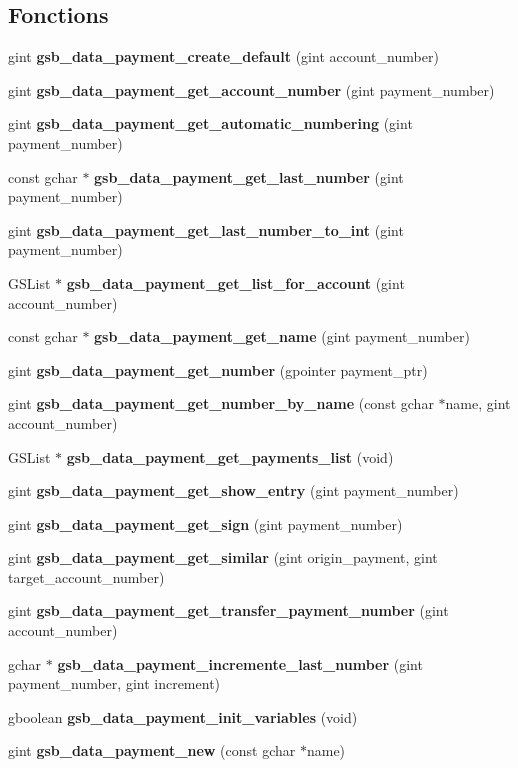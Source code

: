 \subsection*{Fonctions}
\begin{DoxyCompactItemize}
\item 
gint {\bf gsb\_\-data\_\-payment\_\-create\_\-default} (gint account\_\-number)
\item 
gint {\bf gsb\_\-data\_\-payment\_\-get\_\-account\_\-number} (gint payment\_\-number)
\item 
gint {\bf gsb\_\-data\_\-payment\_\-get\_\-automatic\_\-numbering} (gint payment\_\-number)
\item 
const gchar $\ast$ {\bf gsb\_\-data\_\-payment\_\-get\_\-last\_\-number} (gint payment\_\-number)
\item 
gint {\bf gsb\_\-data\_\-payment\_\-get\_\-last\_\-number\_\-to\_\-int} (gint payment\_\-number)
\item 
GSList $\ast$ {\bf gsb\_\-data\_\-payment\_\-get\_\-list\_\-for\_\-account} (gint account\_\-number)
\item 
const gchar $\ast$ {\bf gsb\_\-data\_\-payment\_\-get\_\-name} (gint payment\_\-number)
\item 
gint {\bf gsb\_\-data\_\-payment\_\-get\_\-number} (gpointer payment\_\-ptr)
\item 
gint {\bf gsb\_\-data\_\-payment\_\-get\_\-number\_\-by\_\-name} (const gchar $\ast$name, gint account\_\-number)
\item 
GSList $\ast$ {\bf gsb\_\-data\_\-payment\_\-get\_\-payments\_\-list} (void)
\item 
gint {\bf gsb\_\-data\_\-payment\_\-get\_\-show\_\-entry} (gint payment\_\-number)
\item 
gint {\bf gsb\_\-data\_\-payment\_\-get\_\-sign} (gint payment\_\-number)
\item 
gint {\bf gsb\_\-data\_\-payment\_\-get\_\-similar} (gint origin\_\-payment, gint target\_\-account\_\-number)
\item 
gint {\bf gsb\_\-data\_\-payment\_\-get\_\-transfer\_\-payment\_\-number} (gint account\_\-number)
\item 
gchar $\ast$ {\bf gsb\_\-data\_\-payment\_\-incremente\_\-last\_\-number} (gint payment\_\-number, gint increment)
\item 
gboolean {\bf gsb\_\-data\_\-payment\_\-init\_\-variables} (void)
\item 
gint {\bf gsb\_\-data\_\-payment\_\-new} (const gchar $\ast$name)
\item 

\end{DoxyCompactItemize}
